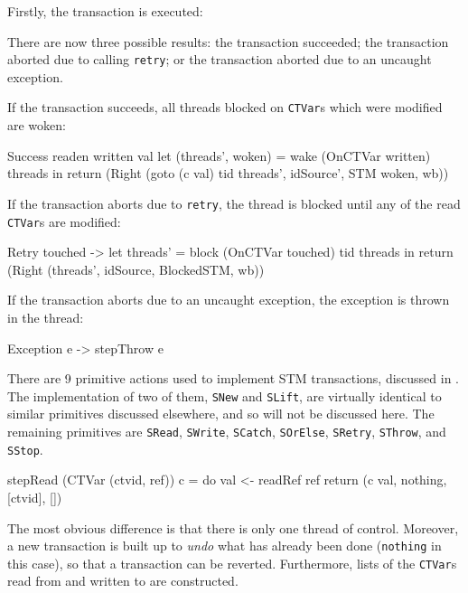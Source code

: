 Firstly, the transaction is executed:


There are now three possible results: the transaction succeeded; the
transaction aborted due to calling \verb|retry|; or the transaction
aborted due to an uncaught exception.

If the transaction succeeds, all threads blocked on \verb|CTVar|s
which were modified are woken:

\begin{haskellcode}
    Success readen written val
      let (threads', woken) = wake (OnCTVar written) threads
      in return (Right (goto (c val) tid threads', idSource', STM woken, wb))
\end{haskellcode}

If the transaction aborts due to \verb|retry|, the thread is blocked
until any of the read \verb|CTVar|s are modified:

\begin{haskellcode}
    Retry touched ->
      let threads' = block (OnCTVar touched) tid threads
      in return (Right (threads', idSource, BlockedSTM, wb))
\end{haskellcode}

If the transaction aborts due to an uncaught exception, the exception
is thrown in the thread:

\begin{haskellcode}
    Exception e -> stepThrow e
\end{haskellcode}

There are 9 primitive actions used to implement STM transactions,
discussed in . The implementation of two of
them, \verb|SNew| and \verb|SLift|, are virtually identical to similar
primitives discussed elsewhere, and so will not be discussed here. The
remaining primitives are \verb|SRead|, \verb|SWrite|, \verb|SCatch|,
\verb|SOrElse|, \verb|SRetry|, \verb|SThrow|, and \verb|SStop|.

\begin{haskellcode}
stepRead (CTVar (ctvid, ref)) c = do
  val <- readRef ref
  return (c val, nothing, [ctvid], [])
\end{haskellcode}

The most obvious difference is that there is only one thread of
control. Moreover, a new transaction is built up to \emph{undo} what
has already been done (\verb|nothing| in this case), so that a
transaction can be reverted. Furthermore, lists of the \verb|CTVar|s
read from and written to are constructed.

